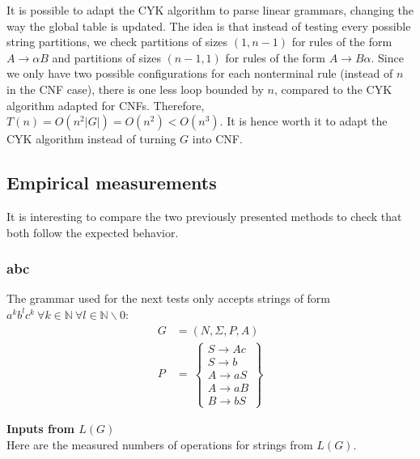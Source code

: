\documentclass[12pt]{extarticle}
\begin{document}
\begin{multicols}{2}
It is possible to adapt the CYK algorithm to parse linear grammars, changing the
way the global table is updated. The idea is that instead of testing every
possible string partitions, we check partitions of sizes $(1, n-1)$ for rules of the
form $A\rightarrow\alpha B$ and partitions of sizes $(n-1,1)$ for rules of the form $A\rightarrow B\alpha$.
Since we only have two possible configurations for each nonterminal rule
(instead of $n$ in the CNF case), there is one less loop bounded by $n$, compared
to the CYK algorithm adapted for CNFs. Therefore,
$T(n)=O(n^2|G|)=O(n^2)<O(n^3)$. It is hence worth it to adapt the CYK algorithm
instead of turning $G$ into CNF.

\newpage
\subsection{Empirical measurements}
It is interesting to compare the two previously presented methods to check that both follow the expected behavior.

\subsubsection{abc}
The grammar used for the next tests only accepts strings of form $a^kb^lc^k\ \forall k\in \mathbb{N}\ \forall l\in\mathbb{N}\backslash 0$:\\
\begin{align*}
  G&=(N,\Sigma,P,A)\\
  P&=\
  \left\{ \begin{array}{l}
    S\rightarrow Ac\\
    S\rightarrow b\\
    A\rightarrow aS\\
    A\rightarrow aB\\
    B\rightarrow bS
  \end{array}\right\}
\end{align*}

\end{multicols}
\textbf{Inputs from $L(G)$}\\
Here are the measured numbers of operations for strings from $L(G)$.\\
\end{document}
